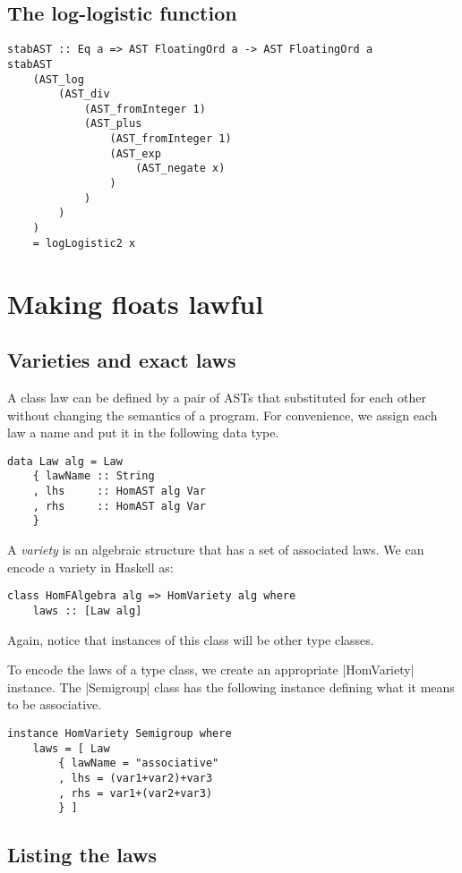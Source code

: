 \documentclass[preprint]{sigplanconf}
\theoremstyle{definition}
\begin{document}
\subsection{The log-logistic function}

\begin{lstlisting}
stabAST :: Eq a => AST FloatingOrd a -> AST FloatingOrd a
stabAST
    (AST_log
        (AST_div
            (AST_fromInteger 1)
            (AST_plus
                (AST_fromInteger 1)
                (AST_exp
                    (AST_negate x)
                )
            )
        )
    )
    = logLogistic2 x
\end{lstlisting}

\section{Making floats lawful}

\subsection{Varieties and exact laws}

A class law can be defined by a pair of ASTs that substituted for each other without changing the semantics of a program.
For convenience, we assign each law a name and put it in the following data type.
\begin{lstlisting}
data Law alg = Law
    { lawName :: String
    , lhs     :: HomAST alg Var
    , rhs     :: HomAST alg Var
    }
\end{lstlisting}
A \emph{variety} is an algebraic structure that has a set of associated laws.
We can encode a variety in Haskell as:
\begin{lstlisting}
class HomFAlgebra alg => HomVariety alg where
    laws :: [Law alg]
\end{lstlisting}
Again, notice that instances of this class will be other type classes.

To encode the laws of a type class, we create an appropriate |HomVariety| instance.
The |Semigroup| class has the following instance defining what it means to be associative.
\begin{lstlisting}
instance HomVariety Semigroup where
    laws = [ Law
        { lawName = "associative"
        , lhs = (var1+var2)+var3
        , rhs = var1+(var2+var3)
        } ]
\end{lstlisting}

\subsection{Listing the laws}
\end{document}
